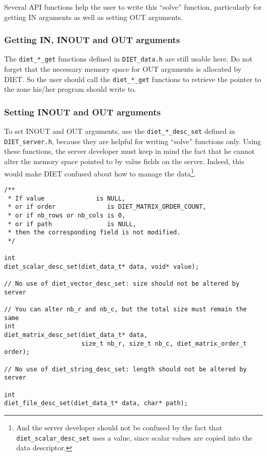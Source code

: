 Several API functions help the user to write this ``solve''
function, particularly for getting IN arguments as well as setting
OUT arguments.

\subsubsection*{Getting IN, INOUT and OUT arguments}

The \texttt{diet\_*\_get} functions defined in \texttt{DIET\_data.h} are still
usable here. Do not forget that the necessary memory space for OUT arguments is
allocated by DIET. So the user should call the \texttt{diet\_*\_get} functions
to retrieve the pointer to the zone his/her program should write to.

\subsubsection*{Setting INOUT and OUT arguments}

To set INOUT and OUT arguments, use the \texttt{diet\_*\_desc\_set} defined
in \texttt{DIET\_server.h}, because they are helpful for writing ``solve''
functions only. Using these functions, the server developer must keep in
mind the fact that he cannot alter the memory space pointed to by
value fields on the server. Indeed, this would make DIET confused
about how to manage the data{\footnote{And the server developer
should not be confused by the fact that
\texttt{diet\_scalar\_desc\_set} uses a value, since scalar values
are copied into the data descriptor.}}.

{\footnotesize
\begin{verbatim}
/**
 * If value              is NULL,
 * or if order              is DIET_MATRIX_ORDER_COUNT,
 * or if nb_rows or nb_cols is 0,
 * or if path               is NULL,
 * then the corresponding field is not modified.
 */

int
diet_scalar_desc_set(diet_data_t* data, void* value);

// No use of diet_vector_desc_set: size should not be altered by server

// You can alter nb_r and nb_c, but the total size must remain the same
int
diet_matrix_desc_set(diet_data_t* data,
                     size_t nb_r, size_t nb_c, diet_matrix_order_t order);

// No use of diet_string_desc_set: length should not be altered by server

int
diet_file_desc_set(diet_data_t* data, char* path);
\end{verbatim}
}


